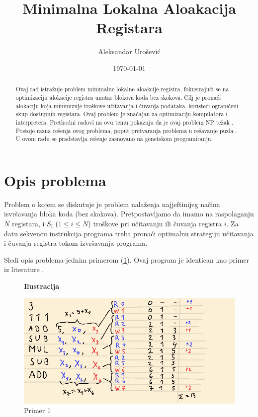 \documentclass[a4paper, 12pt]{article}
\begin{document}
\title{Minimalna Lokalna Aloakacija Registara}
\author{Aleksandar Urošević}
\date{\today}
\maketitle

\begin{abstract}
Ovaj rad istražuje problem minimalne lokalne aloakcije registra, fokusirajući se na optimizaciju alokacije registra unutar blokova koda bez skokova. Cilj je pronaći alokaciju koja minimizuje troškove učitavanja i čuvanja podataka, koristeći ograničeni skup dostupnih registara. Ovaj problem je značajan za optimizaciju kompilatora i interpretera. Prethodni radovi na ovu temu pokazuju da je ovaj problem NP težak \cite{OnLocalRegisterAllocation}. Postoje razna rešenja ovog problema, poput pretvaranja problema u rešavanje puzla \cite{RegisterAllocationByPuzzleSolving}. U ovom radu se pradstavlja rešenje zasnovano na genetskom programiranju.
\end{abstract}

\section{Opis problema}
Problem o kojem se diskutuje je problem nalaženja najjeftinijeg načina isvršavanja bloka koda (bez skokova). Pretpostavljamo da imamo na raspolaganju $N$ registara, i $S_i$ ($1 \leq i \leq N$) troškove pri učitavanju ili čuvanja registra $i$. Za datu sekvencu instrukcija programa treba pronaći optimalnu strategiju učitavanja i čuvanja registra tokom izvršavanja programa. 

Sledi opis problema jednim primerom (\ref{primer1}). Ovaj program je identican kao primer iz literature \cite{EvaluationOfAlgorithmsForLocalRegisterAllocation}.

\begin{figure}
\centering
\textbf{Ilustracija}\par\medskip
\includegraphics[scale=0.45]{Image/Illustration1}
\caption{Primer 1}
\label{primer1}
\end{figure}
\end{document}

